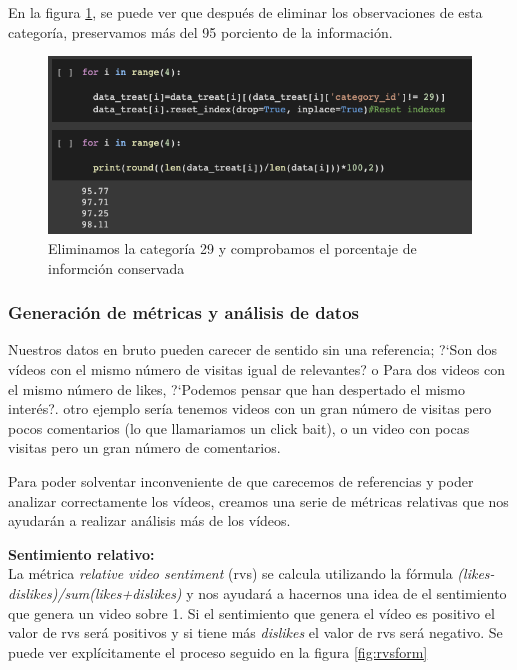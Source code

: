 \documentclass[a4paper,12pt]{article}
\begin{document}
En la figura \ref{fig:cat29}, se puede ver que despu\'es de eliminar los observaciones de esta categor\'ia, preservamos m\'as del 95 porciento de la informaci\'on.

\begin{figure}[h!]
\centering
\includegraphics[width=13cm]{remove_category.png}
\caption{Eliminamos la categor\'ia 29 y comprobamos el porcentaje de informci\'on conservada}
\label{fig:cat29}
\end{figure}





\subsubsection[item_metricas]{Generaci\'on de m\'etricas y an\'alisis de datos}

Nuestros datos en bruto pueden carecer de sentido sin una referencia; ?`Son dos v\'ideos con el mismo n\'umero de visitas igual de relevantes? o Para dos videos con el mismo n\'umero de likes, ?`Podemos pensar que han despertado el mismo inter\'es?. otro ejemplo ser\'ia tenemos videos con un gran n\'umero de visitas pero pocos comentarios (lo que llamariamos un click bait), o un video con pocas visitas pero un gran n\'umero de comentarios.

Para poder solventar inconveniente de que carecemos de referencias y poder analizar correctamente los v\'ideos, creamos una serie de m\'etricas relativas que nos ayudar\'an a realizar an\'alisis m\'as  de los v\'ideos.

\textbf{Sentimiento relativo:} \\
La m\'etrica {\itshape relative video sentiment} (rvs) se calcula utilizando la f\'ormula {\itshape (likes-dislikes)/sum(likes+dislikes)} y nos ayudar\'a a hacernos una idea de el sentimiento que genera un video sobre 1. Si el sentimiento que genera el v\'ideo es positivo el valor de rvs ser\'a positivos y si tiene m\'as {\itshape dislikes} el valor de rvs ser\'a negativo. Se puede ver expl\'icitamente el proceso seguido en la figura \ref{fig:rvsform}
\end{document}
